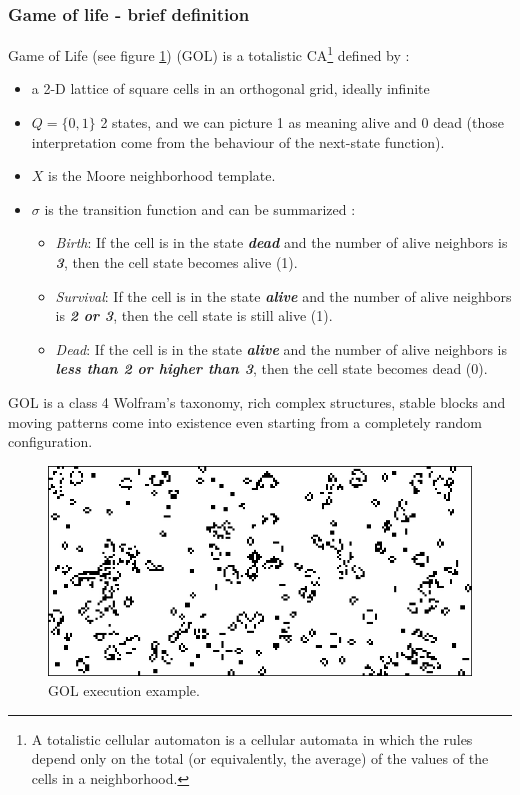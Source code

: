 \subsubsection{Game of life - brief definition} 
Game of Life (see figure \ref{gameoflife}) (GOL)\cite{Conway1970} is a
totalistic CA\footnote{A totalistic cellular automaton is a cellular automata in which the rules depend only on the
total (or equivalently, the average) of the values of the cells in a neighborhood.} defined by :
\begin{itemize}
  \item a 2-D lattice of square cells in an orthogonal grid, ideally infinite
  \item \begin{math}Q=\{0,1\} \end{math} 2 states, and we can picture 1 as
  meaning alive and 0 dead (those interpretation come from the 	
behaviour of the next-state function).
\item \begin{math}X\end{math} is the Moore neighborhood template.
\item \begin{math}\sigma\end{math} is the transition function and can be
summarized :
	\begin{itemize}
	  \item \emph{Birth}: If the cell is in the state \textbf{\textit{dead}} and
	  the number of alive neighbors is \textbf{\textit{3}}, then the cell state
	  becomes alive (1).
	  \item \emph{Survival}: If the cell is in the state \textbf{\textit{alive}}
	  and the number of alive neighbors is \textbf{\textit{2 or 3}}, then the cell
	  state is still alive (1).
	  \item \emph{Dead}: If the cell is in the state \textbf{\textit{alive}} and
	  the number of alive neighbors is \textbf{\textit{less than 2 or higher
	  than 3}}, then the cell state becomes dead (0).
	  \end{itemize}
\end{itemize}

GOL is a class 4 Wolfram's taxonomy, rich complex structures, stable blocks and
moving patterns come into existence even starting from a completely random
configuration. 
\begin{figure}
\centering
\caption{GOL execution example.}
\label{gameoflife}
\includegraphics[scale=0.9]{./images/CA_FDM/game-of-life}
\end{figure}
\FloatBarrier


